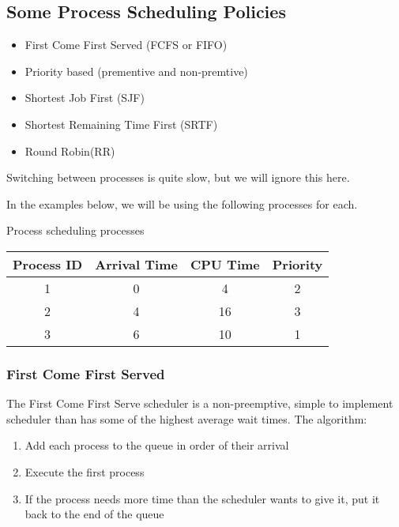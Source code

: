 \subsection{Some Process Scheduling Policies}\label{sub:some_process_scheduling_policies}

\begin{itemize}
    \item First Come First Served (FCFS or FIFO)
    \item Priority based (prementive and non-premtive)
    \item Shortest Job First (SJF)
    \item Shortest Remaining Time First (SRTF)
    \item Round Robin(RR)
\end{itemize}
%
\begin{note}
    Switching between processes is quite slow, but we will ignore this here.
\end{note}
%
In the examples below, we will be using the following processes for each.
\begin{highlight}{Process scheduling processes}
    \begin{tabular}{cccc}
        \toprule
        Process ID & Arrival Time & CPU Time & Priority \\
        \midrule
        1          & 0            & 4        & 2        \\
        2          & 4            & 16       & 3        \\
        3          & 6            & 10       & 1        \\
        \bottomrule
    \end{tabular}
\end{highlight}

\subsubsection{First Come First Served}\label{ssub:first_come_first_served}

The First Come First Serve scheduler is a non-preemptive, simple to implement scheduler than has some of the highest average wait times.
The algorithm:
\begin{enumerate}
    \item Add each process to the queue in order of their arrival
    \item Execute the first process
    \item If the process needs more time than the scheduler wants to give it, put it back to the end of the queue
\end{enumerate}

